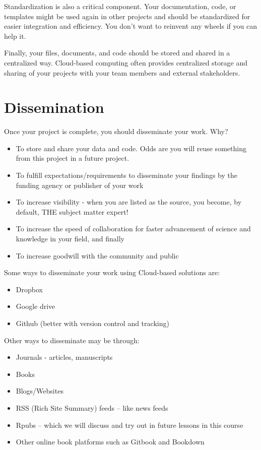 \documentclass[]{book}
\providecommand{\tightlist}{%
  \setlength{\itemsep}{0pt}\setlength{\parskip}{0pt}}
\theoremstyle{definition}
\theoremstyle{definition}
\theoremstyle{definition}
\theoremstyle{remark}
\begin{document}
Standardization is also a critical component. Your documentation, code,
or templates might be used again in other projects and should be
standardized for easier integration and efficiency. You don't want to
reinvent any wheels if you can help it.

Finally, your files, documents, and code should be stored and shared in
a centralized way. Cloud-based computing often provides centralized
storage and sharing of your projects with your team members and external
stakeholders.

\section{Dissemination}\label{dissemination}

Once your project is complete, you should disseminate your work. Why?

\begin{itemize}
\tightlist
\item
  To store and share your data and code. Odds are you will reuse
  something from this project in a future project.
\item
  To fulfill expectations/requirements to disseminate your findings by
  the funding agency or publisher of your work
\item
  To increase visibility - when you are listed as the source, you
  become, by default, THE subject matter expert!
\item
  To increase the speed of collaboration for faster advancement of
  science and knowledge in your field, and finally
\item
  To increase goodwill with the community and public
\end{itemize}

Some ways to disseminate your work using Cloud-based solutions are:

\begin{itemize}
\tightlist
\item
  Dropbox
\item
  Google drive
\item
  Github (better with version control and tracking)
\end{itemize}

Other ways to disseminate may be through:

\begin{itemize}
\tightlist
\item
  Journals - articles, manuscripts
\item
  Books
\item
  Blogs/Websites
\item
  RSS (Rich Site Summary) feeds -- like news feeds
\item
  Rpubs -- which we will discuss and try out in future lessons in this
  course
\item
  Other online book platforms such as Gitbook and Bookdown
\end{itemize}
\end{document}
